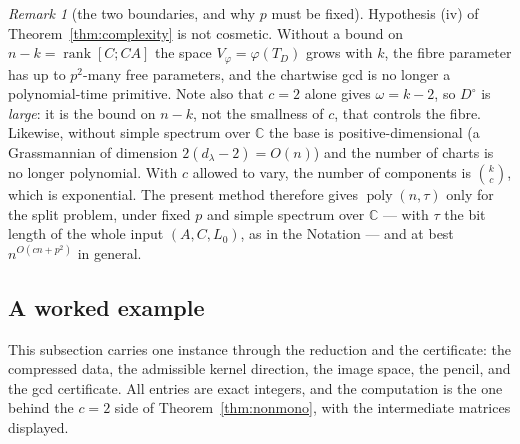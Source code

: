 \documentclass[journal]{IEEEtran}
\theoremstyle{plainn}
\theoremstyle{remark}
\newtheorem{remark}{Remark}
\newcommand{\rank}{\operatorname{rank}}
\newcommand{\poly}{\operatorname{poly}}
\begin{document}
\begin{remark}[the two boundaries, and why $p$ must be fixed]\label{rem:boundaries}
Hypothesis (iv) of Theorem~\ref{thm:complexity} is not cosmetic. Without a bound on
$n-k=\rank[C;CA]$ the space $V_\varphi=\varphi(T_D)$ grows with $k$, the fibre parameter has up to
$p^2$-many free parameters, and the chartwise gcd is no longer a polynomial-time primitive. Note also
that $c=2$ alone gives $\omega=k-2$, so $D^\circ$ is \emph{large}: it is the bound on $n-k$, not the
smallness of $c$, that controls the fibre. Likewise, without simple spectrum over $\mathbb C$ the base is
positive-dimensional (a Grassmannian of dimension $2(d_\lambda-2)=O(n)$) and the number of charts is no
longer polynomial. With $c$ allowed to vary, the number of components is $\binom{k}{c}$, which is
exponential. The present method therefore gives $\poly(n,\tau)$ only for the split problem, under fixed
$p$ and simple spectrum over $\mathbb C$ --- with $\tau$ the bit length of the whole input $(A,C,L_0)$, as
in the Notation --- and at best $n^{O(cn+p^2)}$ in general.
\end{remark}

\subsection{A worked example}\label{sec:example}

This subsection carries one instance through the reduction and the certificate: the compressed data,
the admissible kernel direction, the image space, the pencil, and the gcd certificate. All entries are
exact integers, and the computation is the one behind the $c=2$ side of Theorem~\ref{thm:nonmono},
with the intermediate matrices displayed.
\end{document}
